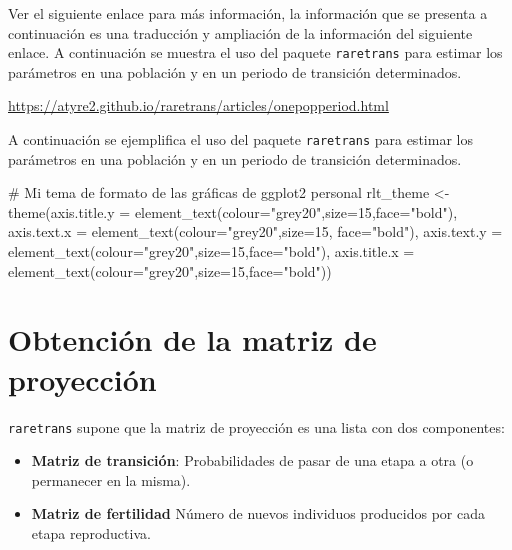 \documentclass[
  12pt,
  letterpaper,
]{book}
\newenvironment{Shaded}{\begin{snugshade}}{\end{snugshade}}
\newcommand{\AttributeTok}[1]{\textcolor[rgb]{0.40,0.45,0.13}{#1}}
\newcommand{\CommentTok}[1]{\textcolor[rgb]{0.37,0.37,0.37}{#1}}
\newcommand{\DecValTok}[1]{\textcolor[rgb]{0.68,0.00,0.00}{#1}}
\newcommand{\FunctionTok}[1]{\textcolor[rgb]{0.28,0.35,0.67}{#1}}
\newcommand{\NormalTok}[1]{\textcolor[rgb]{0.00,0.23,0.31}{#1}}
\newcommand{\OtherTok}[1]{\textcolor[rgb]{0.00,0.23,0.31}{#1}}
\newcommand{\StringTok}[1]{\textcolor[rgb]{0.13,0.47,0.30}{#1}}
\begin{document}
Ver el siguiente enlace para más información, la información que se
presenta a continuación es una traducción y ampliación de la información
del siguiente enlace. A continuación se muestra el uso del paquete
\texttt{raretrans} para estimar los parámetros en una población y en un
periodo de transición determinados.

\url{https://atyre2.github.io/raretrans/articles/onepopperiod.html}

A continuación se ejemplifica el uso del paquete \texttt{raretrans} para
estimar los parámetros en una población y en un periodo de transición
determinados.

\begin{Shaded}
\begin{Highlighting}[]
\CommentTok{\# Mi tema de formato de las gráficas de ggplot2 personal}
\NormalTok{rlt\_theme }\OtherTok{\textless{}{-}} \FunctionTok{theme}\NormalTok{(}\AttributeTok{axis.title.y =} \FunctionTok{element\_text}\NormalTok{(}\AttributeTok{colour=}\StringTok{"grey20"}\NormalTok{,}\AttributeTok{size=}\DecValTok{15}\NormalTok{,}\AttributeTok{face=}\StringTok{"bold"}\NormalTok{),}
        \AttributeTok{axis.text.x =} \FunctionTok{element\_text}\NormalTok{(}\AttributeTok{colour=}\StringTok{"grey20"}\NormalTok{,}\AttributeTok{size=}\DecValTok{15}\NormalTok{, }\AttributeTok{face=}\StringTok{"bold"}\NormalTok{),}
        \AttributeTok{axis.text.y =} \FunctionTok{element\_text}\NormalTok{(}\AttributeTok{colour=}\StringTok{"grey20"}\NormalTok{,}\AttributeTok{size=}\DecValTok{15}\NormalTok{,}\AttributeTok{face=}\StringTok{"bold"}\NormalTok{),  }
        \AttributeTok{axis.title.x =} \FunctionTok{element\_text}\NormalTok{(}\AttributeTok{colour=}\StringTok{"grey20"}\NormalTok{,}\AttributeTok{size=}\DecValTok{15}\NormalTok{,}\AttributeTok{face=}\StringTok{"bold"}\NormalTok{))}
\end{Highlighting}
\end{Shaded}

\section{Obtención de la matriz de
proyección}\label{obtenciuxf3n-de-la-matriz-de-proyecciuxf3n}

\texttt{raretrans} supone que la matriz de proyección es una lista con
dos componentes:

\begin{itemize}
\item
  \textbf{Matriz de transición}: Probabilidades de pasar de una etapa a
  otra (o permanecer en la misma).
\item
  \textbf{Matriz de fertilidad} Número de nuevos individuos producidos
  por cada etapa reproductiva.
\end{itemize}
\end{document}
